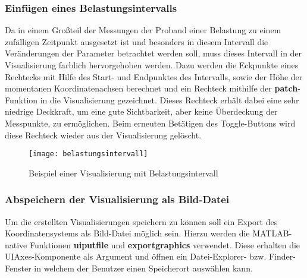 \subsubsection{Einfügen eines Belastungsintervalls}

Da in einem Großteil der Messungen der Proband einer Belastung zu einem zufälligen Zeitpunkt ausgesetzt ist und besonders in diesem Intervall die Veränderungen der Parameter betrachtet werden soll, muss dieses Intervall in der Visualisierung farblich hervorgehoben werden. Dazu werden die Eckpunkte eines Rechtecks mit Hilfe des Start- und Endpunktes des Intervalls, sowie der Höhe der momentanen Koordinatenachsen berechnet und ein Rechteck mithilfe der \textbf{patch}-Funktion in die Visualisierung gezeichnet. Dieses Rechteck erhält dabei eine sehr niedrige Deckkraft, um eine gute Sichtbarkeit, aber keine Überdeckung der Messpunkte, zu ermöglichen. Beim erneuten Betätigen des Toggle-Buttons wird diese Rechteck wieder aus der Visualisierung gelöscht.

\begin{minipage}{\linewidth}

\end{minipage}

\begin{figure}[H]
	\centering
	\texttt{[image: belastungsintervall]}
	\caption{Beispiel einer Visualisierung mit Belastungsintervall}
	\label{fig:belastungsintervall}
\end{figure}

\subsubsection{Abspeichern der Visualisierung als Bild-Datei}

Um die erstellten Visualisierungen speichern zu können soll ein Export des Koordinatensystems als Bild-Datei möglich sein. Hierzu werden die MATLAB-native Funktionen \textbf{uiputfile} und \textbf{exportgraphics} verwendet. Diese erhalten die UIAxes-Komponente als Argument und öffnen ein Datei-Explorer- bzw. Finder-Fenster in welchem der Benutzer einen Speicherort auswählen kann.

\begin{minipage}{\linewidth}

\end{minipage}

